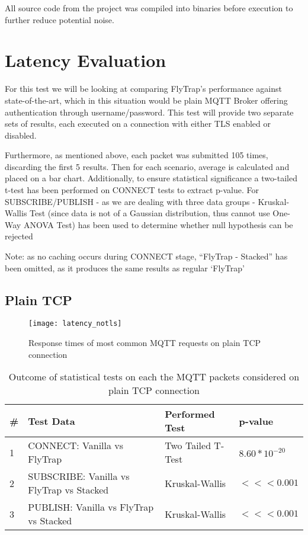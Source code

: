 All source code from the project was compiled into binaries before execution to further reduce potential noise.

\section{Latency Evaluation}
For this test we will be looking at comparing FlyTrap's performance against state-of-the-art, which in this situation would be plain MQTT Broker offering authentication through username/password. This test will provide two separate sets of results, each executed on a connection with either TLS enabled or disabled.

Furthermore, as mentioned above, each packet was submitted 105 times, discarding the first 5 results. Then for each scenario, average is calculated and placed on a bar chart. Additionally, to ensure statistical significance a two-tailed t-test has been performed on CONNECT tests to extract p-value. For SUBSCRIBE/PUBLISH - as we are dealing with three data groups - Kruskal-Wallis Test (since data is not of a Gaussian distribution, thus cannot use One-Way ANOVA Test) has been used to determine whether null hypothesis can be rejected

Note: as no caching occurs during CONNECT stage, ``FlyTrap - Stacked'' has been omitted, as it produces the same results as regular `FlyTrap'
\subsection{Plain TCP}
\begin{figure}[h]
    \centering
    \texttt{[image: latency\_notls]}
    \caption{Response times of most common MQTT requests on plain TCP connection}
    \label{fig:latency_notls}
\end{figure}

\begin{table}[]
\centering
\begin{tabular}{|l|l|l|l|}
\hline
\textbf{\#} & \textbf{Test Data}                       & \textbf{Performed Test} & \textbf{p-value}                      \\ \hline
1           & CONNECT: Vanilla vs FlyTrap              & Two Tailed T-Test       & $8.60*10^{-20}$                    \\ \hline
2           & SUBSCRIBE: Vanilla vs FlyTrap vs Stacked & Kruskal-Wallis          & $<<< 0.001$ \\ \hline
3           & PUBLISH: Vanilla vs FlyTrap vs Stacked & Kruskal-Wallis          & $<<< 0.001$ \\ \hline
\end{tabular}
\caption{Outcome of statistical tests on each the MQTT packets considered on plain TCP connection}
\label{tab:ttest-notls}
\end{table}

